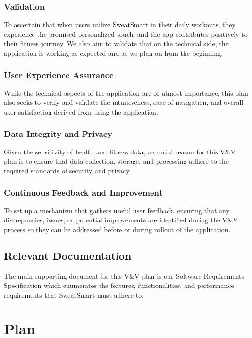 \documentclass[12pt, titlepage]{article}
\begin{document}
\subsubsection{Validation}
To ascertain that when users utilize SweatSmart in their daily workouts, they experience the promised personalized touch, and the app contributes positively to their fitness journey. We also aim to validate that on the technical side, the application is working as expected and as we plan on from the beginning.

\subsubsection{User Experience Assurance}
While the technical aspects of the application are of utmost importance, this plan also seeks to verify and validate the intuitiveness, ease of navigation, and overall user satisfaction derived from using the application.

\subsubsection{Data Integrity and Privacy}
Given the sensitivity of health and fitness data, a crucial reason for this V\&V plan is to ensure that data collection, storage, and processing adhere to the required standards of security and privacy.

\subsubsection{Continuous Feedback and Improvement}
To set up a mechanism that gathers useful user feedback, ensuring that any discrepancies, issues, or potential improvements are identified during the V\&V process so they can be addressed before or during rollout of the application.

\subsection{Relevant Documentation}

The main supporting document for this V\&V plan is our Software Requirements Specification which enumerates the features, functionalities, and performance requirements that SweatSmart must adhere to. 


\section{Plan}
\end{document}
